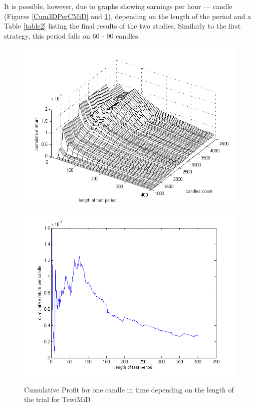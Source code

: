 \documentclass{tewiart}
\begin{document}
It is possible, however, due to graphs showing earnings per hour --- candle (Figures \ref{Cum3DPerCMiD} and \ref{Cum3DPerCMiDend}), depending on the length of the period and a Table \ref{table2} listing the final results of the two studies. Similarly to the first strategy, this period falls on 60 - 90 candles.

\begin{figure}[h!]
\centering
\begin{minipage}{.45\linewidth}
\begin{center}
\includegraphics[width=\textwidth]{pictures/cumulativeReturnsPerCandleD.png}
\label{Cum3DPerCMiD}
\end{center}
\end{minipage}
\begin{minipage}{.45\linewidth}
\begin{center}
\includegraphics[width=\textwidth]{pictures/mid_percandle_end.png}
\label{Cum3DPerCMiDend}
\end{center}
\end{minipage}
\caption{Cumulative Profit for one candle in time depending on the length of the trial for TewiMiD}
\end{figure}
\FloatBarrier
\end{document}

